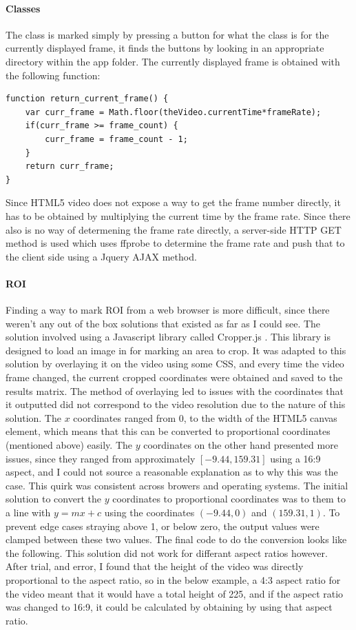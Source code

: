             \paragraph{Classes}
            The class is marked simply by pressing a button for what the class is for the currently displayed frame, it finds the buttons by looking in an appropriate directory within the app folder. The currently displayed frame is obtained with the following function:
                \begin{lstlisting}[style=JSStyle]
function return_current_frame() {
    var curr_frame = Math.floor(theVideo.currentTime*frameRate);
    if(curr_frame >= frame_count) {
        curr_frame = frame_count - 1;
    }
    return curr_frame;
}\end{lstlisting} 
            Since HTML5 video does not expose a way to get the frame number directly, it has to be obtained by multiplying the current time by the frame rate. Since there also is no way of determening the frame rate directly, a server-side HTTP GET method is used which uses ffprobe to determine the frame rate and push that to the client side using a Jquery AJAX method.

            \paragraph{ROI}
            Finding a way to mark ROI from a web browser is more difficult, since there weren't any out of the box solutions that existed as far as I could see. The solution involved using a Javascript library called Cropper.js \cite{cropperjs}. This library is designed to load an image in for marking an area to crop. It was adapted to this solution by overlaying it on the video using some CSS, and every time the video frame changed, the current cropped coordinates were obtained and saved to the results matrix. The method of overlaying led to issues with the coordinates that it outputted did not correspond to the video resolution due to the nature of this solution. The $x$ coordinates ranged from 0, to the width of the HTML5 canvas element, which means that this can be converted to proportional coordinates (mentioned above) easily. The $y$ coordinates on the other hand presented more issues, since they ranged from approximately $[-9.44, 159.31]$ using a 16:9 aspect, and I could not source a reasonable explanation as to why this was the case. This quirk was consistent across browers and operating systems. The initial solution to convert the $y$ coordinates to proportional coordinates was to them to a line with $y=mx+c$ using the coordinates $(-9.44,0)$ and $(159.31,1)$. To prevent edge cases straying above 1, or below zero, the output values were clamped between these two values. The final code to do the conversion looks like the following. This solution did not work for differant aspect ratios however. After trial, and error, I found that the height of the video was directly proportional to the aspect ratio, so in the below example, a 4:3 aspect ratio for the video meant that it would have a total height of 225, and if the aspect ratio was changed to 16:9, it could be calculated by obtaining by using that aspect ratio.

